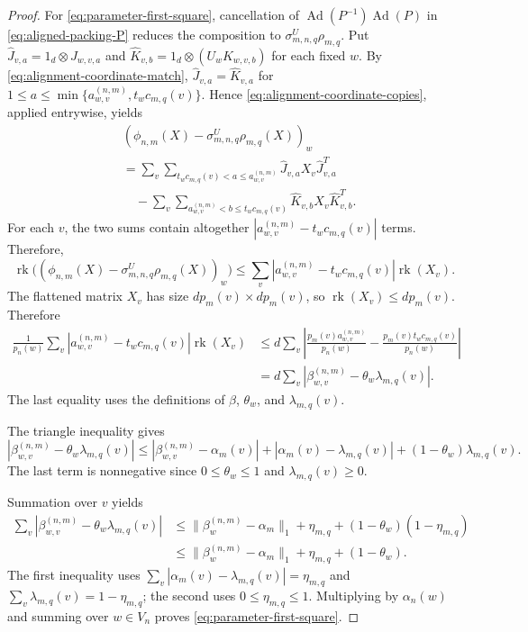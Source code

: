 \documentclass[11pt]{amsart}
\DeclareMathOperator{\rk}{rk}
\DeclareMathOperator{\Ad}{Ad}
\theoremstyle{definition}
\theoremstyle{remark}
\begin{document}
\begin{proof}
For \eqref{eq:parameter-first-square}, cancellation of
$\Ad(P^{-1})\Ad(P)$ in \eqref{eq:aligned-packing-P} reduces the composition to
$\sigma_{m,n,q}^{U}\rho_{m,q}$.
Put $\widehat J_{v,a}=1_d\otimes J_{w,v,a}$ and
$\widehat K_{v,b}=1_d\otimes(U_wK_{w,v,b})$ for each fixed $w$.
By \eqref{eq:alignment-coordinate-match},
$\widehat J_{v,a}=\widehat K_{v,a}$ for
$1\leq a\leq\min\{a_{w,v}^{(n,m)},t_wc_{m,q}(v)\}$.
Hence \eqref{eq:alignment-coordinate-copies}, applied entrywise, yields
\[
 \begin{aligned}
 &(\phi_{n,m}(X)-\sigma_{m,n,q}^{U}\rho_{m,q}(X))_w\\
 &=\sum_v\sum_{t_wc_{m,q}(v)<a\leq a_{w,v}^{(n,m)}}
       \widehat J_{v,a}X_v\widehat J_{v,a}^{T}\\
 &\quad-\sum_v\sum_{a_{w,v}^{(n,m)}<b\leq t_wc_{m,q}(v)}
       \widehat K_{v,b}X_v\widehat K_{v,b}^{T}.
 \end{aligned}
\]
For each $v$, the two sums contain altogether
$|a_{w,v}^{(n,m)}-t_wc_{m,q}(v)|$ terms.
Therefore,
\[
  \rk\bigl((\phi_{n,m}(X)-\sigma_{m,n,q}^{U}\rho_{m,q}(X))_w\bigr)\leq\sum_v|a_{w,v}^{(n,m)}-t_wc_{m,q}(v)|\rk(X_v).
\]
The flattened matrix $X_v$ has size $dp_m(v)\times dp_m(v)$, so
$\rk(X_v)\leq dp_m(v)$.  Therefore
\[
 \begin{aligned}
 \frac1{p_n(w)}\sum_v
 |a_{w,v}^{(n,m)}-t_wc_{m,q}(v)|\rk(X_v)
 &\leq d\sum_v
 \left|\frac{p_m(v)a_{w,v}^{(n,m)}}{p_n(w)}
       -\frac{p_m(v)t_wc_{m,q}(v)}{p_n(w)}\right|\\
 &=d\sum_v
       |\beta_{w,v}^{(n,m)}-\theta_w\lambda_{m,q}(v)|.
 \end{aligned}
\]
The last equality uses the definitions of $\beta$, $\theta_w$, and
$\lambda_{m,q}(v)$.

The triangle inequality gives
\[
 |\beta_{w,v}^{(n,m)}-\theta_w\lambda_{m,q}(v)|
 \leq|\beta_{w,v}^{(n,m)}-\alpha_m(v)|
       +|\alpha_m(v)-\lambda_{m,q}(v)|+(1-\theta_w)\lambda_{m,q}(v).
\]
The last term is nonnegative since $0\leq\theta_w\leq1$ and
$\lambda_{m,q}(v)\geq0$.

Summation over $v$ yields
\[
 \begin{aligned}
 \sum_v|\beta_{w,v}^{(n,m)}-\theta_w\lambda_{m,q}(v)|
 &\leq\|\beta_w^{(n,m)}-\alpha_m\|_1
       +\eta_{m,q}+(1-\theta_w)(1-\eta_{m,q})\\
 &\leq\|\beta_w^{(n,m)}-\alpha_m\|_1
       +\eta_{m,q}+(1-\theta_w).
 \end{aligned}
\]
The first inequality uses
$\sum_v|\alpha_m(v)-\lambda_{m,q}(v)|=\eta_{m,q}$ and
$\sum_v\lambda_{m,q}(v)=1-\eta_{m,q}$; the second uses
$0\leq\eta_{m,q}\leq1$.
Multiplying by $\alpha_n(w)$ and summing over $w\in V_n$ proves
\eqref{eq:parameter-first-square}.


\end{proof}
\end{document}
